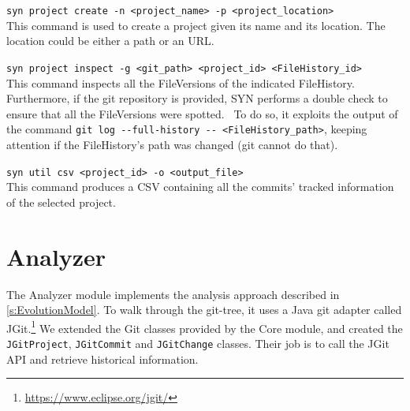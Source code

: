 \bigbreak
\noindent
\verb|syn project create -n <project_name> -p <project_location>| \\
\indent
This command is used to create a project given its name and its location. The location could be either a path or an URL. 

\bigbreak
\noindent
\verb|syn project inspect -g <git_path> <project_id> <FileHistory_id>|\\
\indent
This command inspects all the FileVersions of the indicated FileHistory. Furthermore, if the git repository is provided, SYN performs a double check to ensure that all the FileVersions were spotted. \
To do so, it exploits the output of the command \verb|git log --full-history -- <FileHistory_path>|, keeping attention if the FileHistory's path was changed (git cannot do that).


\bigbreak
\noindent
\verb|syn util csv <project_id> -o <output_file>|\\
\indent
This command produces a CSV containing all the commits' tracked information of the selected project. 


\section{Analyzer}
\label{sec:SYNAnalyzer}
The Analyzer module implements the analysis approach described in \autoref{s:EvolutionModel}.
To walk through the git-tree, it uses a Java git adapter called JGit.\footnote{\url{https://www.eclipse.org/jgit/}} 
We extended the Git classes provided by the Core module, and created the \texttt{JGitProject}, \texttt{JGitCommit} and \texttt{JGitChange} classes. Their job is to call the JGit API and retrieve historical information. 


